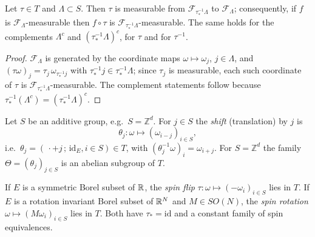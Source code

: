 \begin{lemma}
    \label{lem:trans-cylinder-transport}
    \leanok

    Let $\tau \in T$ and $\Lambda \subset S$.  Then $\tau$ is measurable from
    $\mathcal{F}_{\tau_*^{-1}\Lambda}$ to $\mathcal{F}_\Lambda$; consequently, if $f$ is
    $\mathcal{F}_\Lambda$-measurable then $f \circ \tau$ is
    $\mathcal{F}_{\tau_*^{-1}\Lambda}$-measurable.  The same holds for the complements
    $\Lambda^c$ and $(\tau_*^{-1}\Lambda)^c$, for $\tau$ and for $\tau^{-1}$.
\end{lemma}
\begin{proof}
    \leanok

    $\mathcal{F}_\Lambda$ is generated by the coordinate maps $\omega \mapsto \omega_j$,
    $j \in \Lambda$, and $(\tau\omega)_j = \tau_j\,\omega_{\tau_*^{-1}j}$ with
    $\tau_*^{-1} j \in \tau_*^{-1}\Lambda$; since $\tau_j$ is measurable, each such coordinate
    of $\tau$ is $\mathcal{F}_{\tau_*^{-1}\Lambda}$-measurable.  The complement statements
    follow because $\tau_*^{-1}(\Lambda^c) = (\tau_*^{-1}\Lambda)^c$.
\end{proof}

\begin{example}
    \label{ex:trans-shift}
    \leanok

    Let $S$ be an additive group, e.g.\ $S = \mathbb{Z}^d$.  For $j \in S$ the \emph{shift}
    (translation) by $j$ is
    \[\theta_j : \omega \mapsto (\omega_{i-j})_{i \in S},\]
    i.e.\ $\theta_j = (\,\cdot + j\,;\, \mathrm{id}_E, i \in S) \in T$, with
    $(\theta_j^{-1}\omega)_i = \omega_{i+j}$.  For $S = \mathbb{Z}^d$ the family
    $\Theta = (\theta_j)_{j \in S}$ is an abelian subgroup of $T$.
\end{example}

\begin{example}
    \label{ex:trans-spin-flip}

    If $E$ is a symmetric Borel subset of $\mathbb{R}$, the \emph{spin flip}
    $\tau : \omega \mapsto (-\omega_i)_{i \in S}$ lies in $T$.  If $E$ is a rotation invariant
    Borel subset of $\mathbb{R}^N$ and $M \in SO(N)$, the \emph{spin rotation}
    $\omega \mapsto (M\omega_i)_{i \in S}$ lies in $T$.  Both have $\tau_* = \mathrm{id}$ and a
    constant family of spin equivalences.
\end{example}


